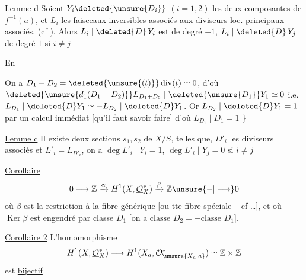 \uline{Lemme d} Soient $Y_i\deleted{\unsure{D_i}}$ $(i=1,2)$ les deux composantes de $f^{-1}(a)$, et $L_i$ les faisceaux inversibles associés  aux diviseurs loc. principaux associés. (cf ). Alors $L_i\mid\deleted{D}\,Y_{i}$ est de degré $-1$, $L_i\mid\deleted{D}\,Y_j$ de degré $1$ si $i\ne j$

En

On a $D_1+D_2=\deleted{\unsure{(t)}}\operatorname{div}(t)\simeq0$, d'où $\deleted{\unsure{d_1(D_1+D_2)}}L_{D_1+D_2}\mid\deleted{\unsure{D_1}}Y_1\simeq0$ i.e. $L_{D_1}\mid\deleted{D}Y_1\simeq-L_{D_{2}}\mid\deleted{D}Y_1$. Or $L_{D_2}\mid\deleted{D}Y_1=1$ par un calcul immédiat [qu'il faut savoir faire] d'où $L_{D_1}\mid D_1=1$ $\}$

\uline{Lemme c} Il existe deux sections $s_1,s_2$ de $X/S$, telles que,  $D'_i$  les diviseurs associés et $L'_i=L_{D'_i}$,  on a $\deg L'_i\mid Y_i=1$, $\deg L'_i\mid Y_j=0$ si $i\ne j$

\uline{Corollaire }  
\[
0\longrightarrow\mathbb Z\xrightarrow{\alpha}H^1(X,\underline{\mathcal O}_X^*)\xrightarrow{\beta}\mathbb Z\unsure{-|\longrightarrow}0
\]
où  $\beta$ est    la restriction à la fibre générique [ou tte fibre spéciale  -- cf \ldots], et où $\operatorname{Ker}\beta$ est engendré par  classe $D_1$ [on a $\text{classe }D_2=-\text{classe }D_1$].

\margin{$\uparrow$} \uline{Corollaire 2}  L'homomorphisme
\[
H^1(X,\underline{\mathcal O}_X^*)\longrightarrow H^1(X_a,\mathcal O_{\unsure{X_a|a}}^*)\simeq\mathbb Z\times\mathbb Z
\]
est \uline{bijectif}
